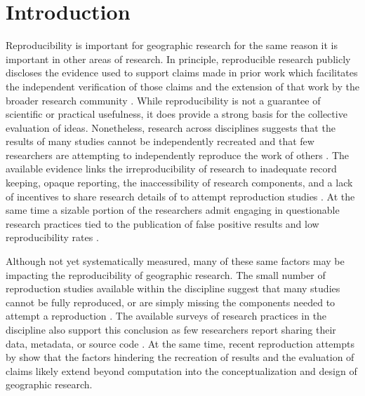 \documentclass[]{interact}
\theoremstyle{plain}%
\theoremstyle{definition}
\theoremstyle{remark}
\begin{document}
\section*{Introduction}
Reproducibility is important for geographic research for the same reason it is important in other areas of research. 
In principle, reproducible research publicly discloses the evidence used to support claims made in prior work which facilitates the independent verification of those claims and the extension of that work by the broader research community \citep{earp2015, nosek2012scientific, Schmidt2009} .
While reproducibility is not a guarantee of scientific or practical usefulness, it does provide a strong basis for the collective evaluation of ideas.
Nonetheless, research across disciplines suggests that the results of many studies cannot be independently recreated \citep[see][]{moraila2014measuring, chang2015economics, open2015estimating, iqbal2016reproducible} and that few researchers are attempting to independently reproduce the work of others \citep{baker20161, boulbes2018survey}.
The available evidence links the irreproducibility of research to inadequate record keeping, opaque reporting, the inaccessibility of research components, and a lack of incentives to share research details of to attempt reproduction studies \citep{ranstam2000fraud, anderson2007normative, NASEM2019}.
At the same time a sizable portion of the researchers admit engaging in questionable research practices tied to the publication of false positive results and low reproducibility rates \citep{fanelli2009many, fraser2018questionable}.

Although not yet systematically measured, many of these same factors may be impacting the reproducibility of geographic research.
The small number of reproduction studies available within the discipline suggest that many studies cannot be fully reproduced, or are simply missing the components needed to attempt a reproduction \citep[see][]{ Kedron2021ssrn, konkol2019, Nust-AGILE_2018, Nust_AGILE_2020, Nust_AGILE_2021, Nust_AGILE_2022, ostermann2021, paez2022reproducibility}.
The available surveys of research practices in the discipline also support this conclusion as few researchers report sharing their data, metadata, or source code \citep{balz2020reproducibility, konkol2019, ostermann2017}.
At the same time, recent reproduction attempts by \citet{Kedron_MollaloRP, Kedron_SaffaryRP, Kedron_VijayanRP} show that the factors hindering the recreation of results and the evaluation of claims likely extend beyond computation into the conceptualization and design of geographic research.
\end{document}
